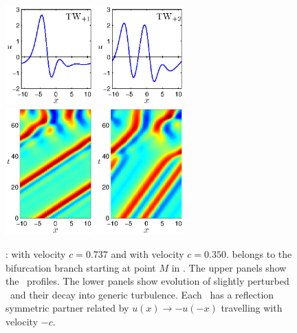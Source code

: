 \begin{figure}[t]
\begin{center}
\includegraphics[width=0.3\textwidth]{figs/ks22_TW1_profile.eps}
\includegraphics[width=0.3\textwidth]{figs/ks22_TW2_profile.eps}\\
\includegraphics[width=0.3\textwidth]{figs/ks22_TW1_orbit.eps}
\includegraphics[width=0.3\textwidth]{figs/ks22_TW2_orbit.eps}
\end{center}
\caption{
\Reqva :  with velocity $c = 0.737$ and  with
velocity $c = 0.350$.
 belongs to the bifurcation branch starting
at point $M$ in .
The upper panels show the \reqva\ profiles.  The lower panels show
evolution of slightly perturbed \reqva\ and their decay into generic
turbulence. Each \reqv\ has a reflection symmetric partner related by
$u(x) \to -u(-x)$ travelling with velocity $-c$.
} \label{f:ks22TW}
\end{figure}

